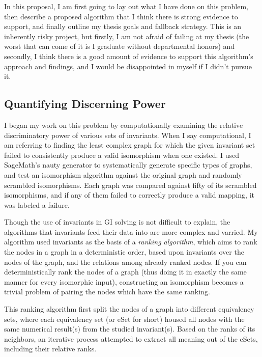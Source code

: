 \documentclass[a4paper,12pt]{article}
\begin{document}
In this proposal, I am first going to lay out what I have done on this problem, then describe a proposed
algorithm that I think there is strong evidence to support, and finally outline my thesis
goals and fallback strategy.  This is an inherently risky project, but firstly, I am not afraid of failing at my thesis 
(the worst that can come of it is I graduate without departmental honors) and secondly,
 I think there is a good amount of evidence to support this algorithm's approach and findings, and I would be disappointed in myself if I didn't pursue it. 

\subsection*{Quantifying Discerning Power}

I began my work on this problem by computationally examining the relative
discriminatory power of various sets of invariants. When I say computational, I am referring to
finding the least complex graph for which the given invariant set
failed to consistently produce a valid isomorphism when one existed. I used SageMath's nauty generator
to systematically generate specific types of graphs, and test an isomorphism algorithm against
the original graph and randomly scrambled isomorphisms. Each graph was compared against
fifty of its scrambled isomorphisms, and if any of them failed to correctly produce a valid mapping,
it was labeled a failure.

Though the use of invariants in GI solving is not difficult to explain, the algorithms that invariants 
feed their data into are more complex and varried. My algorithm used invariants as the basis of a \emph{ranking algorithm}, which aims to rank the 
nodes in a graph in a deterministic order, based upon invariants over the nodes of the graph, and the 
relations among already ranked nodes. If you can deterministically rank the nodes of a graph
(thus doing it in exactly the same manner for every isomorphic input), constructing an isomorphism
becomes a trivial problem of pairing the nodes which have the same ranking.

This ranking algorithm first split the nodes of a graph into different equivalency sets,
where each equivalency set (or eSet for short) housed all nodes with the same numerical
result(s) from the studied invariant(s). Based on the ranks of its neighbors, an iterative process
attempted to extract all meaning out of the eSets, including their relative ranks.
\end{document}
